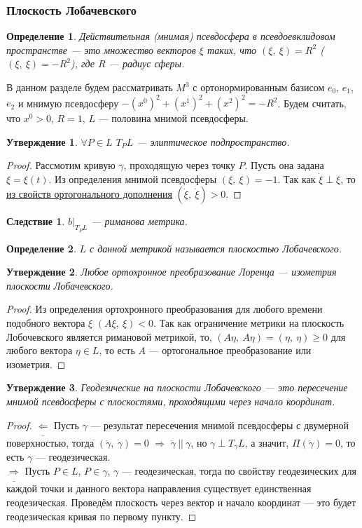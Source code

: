 \documentclass[12pt]{article}
\theoremstyle{plain}
\newtheorem{consequence}{Следствие}[theorem]
\newtheorem{subtheorem}{Утверждение}[section]
\newtheorem{definition}{Определение}[section]
\begin{document}
    \subsubsection{Плоскость Лобачевского}
    \begin{definition}
        Действительная (мнимая) псевдосфера в псевдоевклидовом пространстве --- это множество векторов $\xi$ таких, что $(\xi, \ \xi)=R^2$ ($(\xi, \ \xi)=-R^2$), где $R$ --- радиус сферы.
    \end{definition}
    В данном разделе будем рассматривать $M^{3}$ с ортонормированным базисом $e_0$, $e_1$, $e_2$ и мнимую псевдосферу $-(x^0)^2+(x^1)^2+(x^2)^2=-R^2$. Будем считать, что $x^0>0$, $R=1$, $L$ --- половина мнимой псевдосферы.
    \begin{subtheorem}
        $\forall P\in L$ $T_PL$ --- элиптическое подпространство.
    \end{subtheorem}
    \begin{proof}
        Рассмотим кривую $\gamma$, проходящую через точку $P$. Пусть она задана $\xi=\xi(t)$. Из определения мнимой псевдосферы $(\xi, \ \xi)=-1$. Так как $\dot{\xi}\perp\xi$, то \hyperlink{16}{из свойств ортогонального дополнения} $(\dot{\xi}, \ \dot{\xi})>0$.
    \end{proof}
    \begin{consequence}
        $b|_{T_PL}$ --- риманова метрика.
    \end{consequence}
    \begin{definition}
        $L$ с данной метрикой называется плоскостью Лобачевского.
    \end{definition}
    \begin{subtheorem}
        Любое ортохронное преобразование Лоренца --- изометрия плоскости Лобачевского.
    \end{subtheorem}
    \begin{proof}
         Из определения ортохронного преобразования для любого времени подобного вектора $\xi$ $(A\xi, \ \xi)<0$. Так как ограничение метрики на плоскость Лобочевского является римановой метрикой, то, $(A\eta, \ A\eta)=(\eta, \ \eta)\geqslant0$ для любого вектора $\eta\in L$, то есть $A$ --- ортогональное преобразование или изометрия.
    \end{proof}
    \begin{subtheorem}
        Геодезические на плоскости Лобачевского --- это пересечение мнимой псевдосферы с плоскостями, проходящими через начало координат.
    \end{subtheorem}
    \begin{proof}
        $\underline{\Longleftarrow}$ Пусть $\gamma$ --- результат пересечения мнимой псевдосферы с двумерной поверхностью, тогда $(\ddot{\gamma}, \ \dot{\gamma})=0$ $\Longrightarrow$ $\ddot{\gamma} \ || \ \gamma$, но $\gamma\perp T_{\gamma}L$, а значит, $\Pi(\ddot{\gamma})=0$, то есть $\gamma$ --- геодезическая.\\
        $\underline{\Longrightarrow}$ Пусть $P\in L$, $P\in\gamma$, $\gamma$ --- геодезическая, тогда по свойству геодезических для каждой точки и данного вектора направления существует единственная геодезическая. Проведём плоскость через вектор и начало координат --- это будет геодезическая кривая по первому пункту.
    \end{proof}
\end{document}
